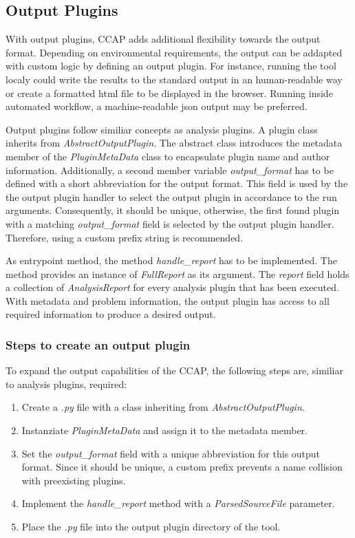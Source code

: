 \subsection{Output Plugins}
With output plugins, CCAP adds additional flexibility towards the output format. Depending on environmental requirements, the output can be addapted with custom logic by defining an output plugin. For instance, running the tool localy could write the results to the standard output in an human-readable way or create a formatted html file to be displayed in the browser. Running inside automated workflow, a machine-readable json output may be preferred.

Output plugins follow similiar concepts as analysis plugins. A plugin class inherits from \textit{AbstractOutputPlugin}. The abstract class introduces the metadata member of the \textit{PluginMetaData} class to encapsulate plugin name and author information. Additionally, a second member variable \textit{output\_format} has to be defined with a short abbreviation for the output format. This field is used by the the output plugin handler to select the output plugin in accordance to the run arguments. Consequently, it should be unique, otherwise, the first found plugin with a matching \textit{output\_format} field is selected by the output plugin handler. Therefore, using a custom prefix string is recommended.

As entrypoint method, the method \textit{handle\_report} has to be implemented. The method provides an instance of \textit{FullReport} as its argument. The  \textit{report} field holds a collection of  \textit{AnalysisReport} for every analysis plugin that has been executed. With metadata and problem information, the output plugin has access to all required information to produce a desired output.

\subsubsection{Steps to create an output plugin}
To expand the output capabilities of the CCAP, the following steps are, similiar to analysis plugins, required:
\begin{enumerate}
    \item Create a \textit{.py} file with a class inheriting from \textit{AbstractOutputPlugin}.
    \item Instanziate \textit{PluginMetaData} and assign it to the metadata member.
    \item Set the \textit{output\_format} field with a unique abbreviation for this output format. Since it should be unique, a custom prefix prevents a name collision with preexisting plugins.
    \item Implement the \textit{handle\_report} method with a \textit{ParsedSourceFile} parameter. 
    \item Place the \textit{.py} file into the output plugin directory of the tool.
\end{enumerate}

